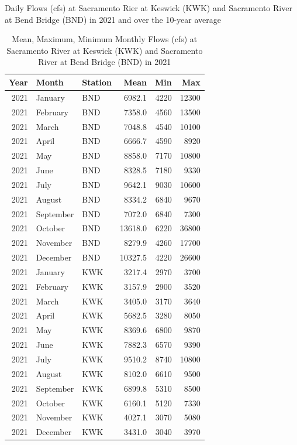 \documentclass[
]{book}
\theoremstyle{definition}
\theoremstyle{definition}
\theoremstyle{definition}
\theoremstyle{definition}
\theoremstyle{remark}
\begin{document}
\label{fig:KWKBNDflow-fig}Daily Flows (cfs) at Sacramento Rier at Keswick (KWK) and Sacramento River at Bend Bridge (BND) in 2021 and over the 10-year average

\begin{table}
\centering
\caption{Mean, Maximum, Minimum Monthly Flows (cfs) at Sacramento River at Keswick (KWK) and Sacramento River at Bend Bridge (BND)  in 2021}
\centering
\begin{tabular}[t]{rllrrr}
\hline
Year & Month & Station & Mean & Min & Max\\
\hline
2021 & January & BND & 6982.1 & 4220 & 12300\\
\hline
2021 & February & BND & 7358.0 & 4560 & 13500\\
\hline
2021 & March & BND & 7048.8 & 4540 & 10100\\
\hline
2021 & April & BND & 6666.7 & 4590 & 8920\\
\hline
2021 & May & BND & 8858.0 & 7170 & 10800\\
\hline
2021 & June & BND & 8328.5 & 7180 & 9330\\
\hline
2021 & July & BND & 9642.1 & 9030 & 10600\\
\hline
2021 & August & BND & 8334.2 & 6840 & 9670\\
\hline
2021 & September & BND & 7072.0 & 6840 & 7300\\
\hline
2021 & October & BND & 13618.0 & 6220 & 36800\\
\hline
2021 & November & BND & 8279.9 & 4260 & 17700\\
\hline
2021 & December & BND & 10327.5 & 4220 & 26600\\
\hline
2021 & January & KWK & 3217.4 & 2970 & 3700\\
\hline
2021 & February & KWK & 3157.9 & 2900 & 3520\\
\hline
2021 & March & KWK & 3405.0 & 3170 & 3640\\
\hline
2021 & April & KWK & 5682.5 & 3280 & 8050\\
\hline
2021 & May & KWK & 8369.6 & 6800 & 9870\\
\hline
2021 & June & KWK & 7882.3 & 6570 & 9390\\
\hline
2021 & July & KWK & 9510.2 & 8740 & 10800\\
\hline
2021 & August & KWK & 8102.0 & 6610 & 9500\\
\hline
2021 & September & KWK & 6899.8 & 5310 & 8500\\
\hline
2021 & October & KWK & 6160.1 & 5120 & 7330\\
\hline
2021 & November & KWK & 4027.1 & 3070 & 5080\\
\hline
2021 & December & KWK & 3431.0 & 3040 & 3970\\
\hline
\end{tabular}
\end{table}
\end{document}
